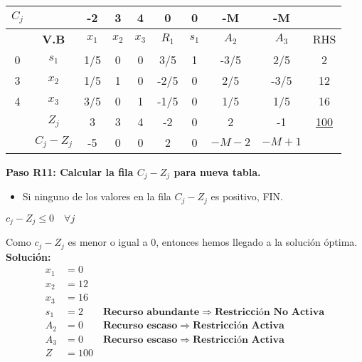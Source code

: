 \documentclass{templateNote}
\begin{document}
\newpage
\begin{center}
    \begin{tabular}{|c|c|c|c|c|c|c|c|c|c|}
        \hline
        $C_j$ & & -2 & 3 & 4 & 0 & 0 & -M & -M & \\ \hline
        & \textbf{V.B} & $x_1$ & $x_2$ & $x_3$ & $R_1$ & $s_1$ & $A_2$ & $A_3$ & RHS \\ \hline
        0 & $s_1$ & 1/5 & 0 & 0 & 3/5 & 1 & -3/5 & 2/5 & 2 \\ \hline
        3 & $x_2$ & 1/5 & 1 & 0 & -2/5 & 0 & 2/5 & -3/5 & 12 \\ \hline
        4 & $x_3$ & 3/5 & 0 & 1 & -1/5 & 0 & 1/5 & 1/5 & 16 \\ \hline
        & $Z_j$ & 3 & 3 & 4 & -2 & 0 & 2 & -1 & \underline{100} \\ \hline
        & $C_j - Z_j$ & -5 & 0 & 0 & 2 & 0 & $-M-2$ & $-M+1$ & \\ \hline
    \end{tabular}
\end{center}
\textbf{Paso R11: Calcular la fila $C_j - Z_j$ para nueva tabla.}
\begin{itemize}
    \item Si ninguno de los valores en la fila $C_j - Z_j$ es positivo,  FIN.
\end{itemize}
\begin{center}
    $c_j - Z_j \leq 0 \quad \forall j$
\end{center}

Como $c_j - Z_j$ es menor o igual a 0, entonces hemos llegado a la solución óptima.
\textbf{Solución:}
\begin{align*}
    x_1 &= 0 \\
    x_2 &= 12 \\
    x_3 &= 16 \\
    s_1 &= 2 \qquad \textbf{Recurso abundante} \Rightarrow \textbf{Restricción No Activa}\\
    A_2 &= 0 \qquad \textbf{Recurso escaso} \Rightarrow \textbf{Restricción Activa}\\
    A_3 &= 0 \qquad \textbf{Recurso escaso} \Rightarrow \textbf{Restricción Activa}\\
    Z &= 100
\end{align*}

\newpage
\end{document}
